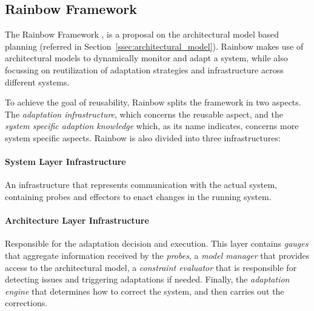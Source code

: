 \subsection{Rainbow Framework}
\label{ssec:rainbowframework}
\par The Rainbow Framework \cite{Garlan2004}, is a proposal on the architectural model based planning (referred in Section~\ref{ssec:architectural_model}). Rainbow makes use of architectural models to dynamically monitor and adapt a system, while also focussing on reutilization of adaptation strategies and infrastructure across different systems.
\par To achieve the goal of reusability, Rainbow splits the framework in two aspects. The \textit{adaptation infrastructure}, which concerns the reusable aspect, and the \textit{system specific adaption knowledge} which, as its name indicates, concerns more system specific aspects. Rainbow is also divided into three infrastructures:
\paragraph{System Layer Infrastructure} An infrastructure that represents communication with the actual system, containing probes and effectors to enact changes in the running system. 
\paragraph{Architecture Layer Infrastructure} Responsible for the adaptation decision and execution. This layer contains \textit{gauges} that aggregate information received by the \textit{probes}, a \textit{model manager} that provides access to the architectural model, a \textit{constraint evaluator} that is responsible for detecting issues and triggering adaptations if needed. Finally, the \textit{adaptation engine} that determines how to correct the system, and then carries out the corrections.
